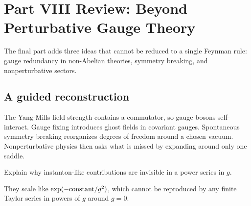 
\chapter{Part VIII Review: Beyond Perturbative Gauge Theory}

The final part adds three ideas that cannot be reduced to a single Feynman rule: gauge redundancy in non-Abelian theories, symmetry breaking, and nonperturbative sectors.

\section{A guided reconstruction}













The Yang-Mills field strength contains a commutator, so gauge bosons self-interact.  Gauge fixing introduces ghost fields in covariant gauges.  Spontaneous symmetry breaking reorganizes degrees of freedom around a chosen vacuum.  Nonperturbative physics then asks what is missed by expanding around only one saddle.

\begin{exercise}
Explain why instanton-like contributions are invisible in a power series in \(g\).
\begin{answer}
They scale like \(\exp(-\hbox{constant}/g^2)\), which cannot be reproduced by any finite Taylor series in powers of \(g\) around \(g=0\).
\end{answer}
\end{exercise}
